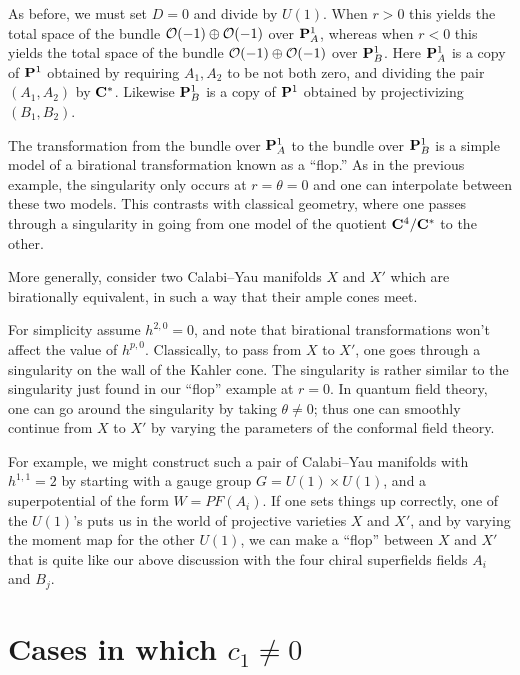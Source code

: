 As before, we must set $D=0$ and divide by $U(1)$.
When $r>0$ this yields the total space of the bundle ${\cal
O}(-1)\oplus{\cal O}(-1)$
over ${\bf P}^1_A$, whereas
when $r<0$ this yields the total space of the bundle ${\cal
O}(-1)\oplus{\cal O}(-1)$
over ${\bf P}^1_B$.
Here ${\bf P}^1_A$ is a copy of ${\bf P}^1$ obtained by requiring
$A_1, A_2$ to be not both zero, and dividing the pair $(A_1,A_2)$ by
${\bf C}^*$.  Likewise ${\bf P}^1_B$ is a copy of ${\bf P}^1$ obtained
by projectivizing $(B_1,B_2)$.

The transformation from the bundle over ${\bf P}^1_A$ to the bundle
over ${\bf P}^1_B$  is a simple model of a birational transformation
known as a
``flop.''  As in the previous example, the singularity only occurs at
$r=\theta=0$ and
one can interpolate between these two models.  This contrasts with
classical geometry, where one passes through a singularity in going
from one model of the quotient ${\bf C}^4/{\bf C}^*$ to the other.

\centerline{\quad}
\centerline{\epsfysize=1.35in}
\centerline{\quad}

More generally, consider two Calabi--Yau manifolds $X$ and $X'$ which are
birationally
equivalent, in such a way that their ample cones meet.

\centerline{\quad}
\centerline{\epsfxsize=1in}
\centerline{\quad}

\noindent
For simplicity assume $h^{2,0}=0$, and note that birational transformations
won't affect
the value of $h^{p,0}$.
Classically, to pass from $X$ to $X'$, one goes through a singularity
on the wall of the Kahler cone.  The singularity is rather similar to
the singularity just found in our ``flop'' example at $r=0$.
In quantum field theory, one can
go around the singularity by taking $\theta\not= 0$; thus
 one can smoothly continue from $X$ to $X'$ by varying the parameters
 of the conformal field theory.

 For example, we might construct such a pair of
Calabi--Yau
manifolds with $h^{1,1}=2$ by starting with a gauge group $G=U(1)\times
U(1)$, and
a superpotential of the form $W=PF(A_i)$.  If one sets things up
correctly, one of the $U(1)$'s puts us in the world of projective varieties
$X$ and $X'$, and by varying the moment map for the other $U(1)$,
we can make a ``flop'' between $X$ and $X'$ that is quite like
our above discussion with the       four chiral superfields
    fields $A_i$ and $B_j$.


\section{Cases in which $c_1\ne0$}

